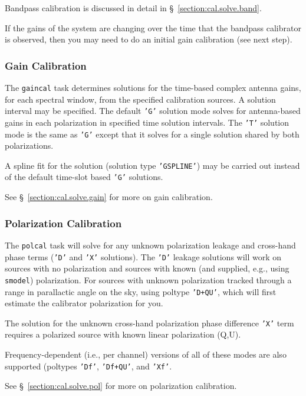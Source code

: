 Bandpass calibration is discussed in detail in
\S~\ref{section:cal.solve.band}.

If the gains of the system are changing over the time that the
bandpass calibrator is observed, then you may need to do an initial
gain calibration (see next step).

\subsubsection{Gain Calibration}
\label{section:intro.walkthru.calib.gaincal}

The {\tt gaincal} task determines solutions for the time-based complex
antenna gains, for each spectral window, from the specified
calibration sources.  A solution interval may be specified. The
default {\tt 'G'} solution mode solves for antenna-based gains 
in each polarization in specified time solution intervals.  The {\tt 'T'}
solution mode is the same as {\tt 'G'} except that it solves for
a single solution shared by both polarizations.

A spline fit for the solution (solution type {\tt 'GSPLINE'}) may be
carried out instead of the default time-slot based {\tt 'G'} solutions.

See \S~\ref{section:cal.solve.gain} for more on gain calibration.

\subsubsection{Polarization Calibration}
\label{section:intro.walkthru.calib.polcal}

The {\tt polcal} task will solve for any unknown polarization leakage
and cross-hand phase terms ({\tt 'D'} and {\tt 'X'} solutions).  The
{\tt 'D'} leakage solutions will work on sources with no polarization and
sources with known (and supplied, e.g., using {\tt smodel}) polarization.
For sources with unknown polarization tracked through a range in parallactic 
angle on the sky, using poltype {\tt 'D+QU'}, which will first estimate
the calibrator polarization for you.

The solution for the unknown cross-hand polarization phase difference
{\tt 'X'} term requires a polarized source with known linear
polarization (Q,U).

Frequency-dependent (i.e., per channel) versions of all of these modes
are also supported (poltypes {\tt 'Df'}, {\tt 'Df+QU'}, and {\tt 'Xf'}.

See \S~\ref{section:cal.solve.pol} for more on polarization calibration.

